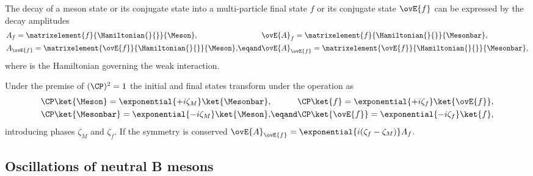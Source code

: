 The decay of a meson state \Meson or its \CP conjugate state \Mesonbar into a
multi-particle final state $f$ or its \CP conjugate state $\ovE{f}$ can be
expressed by the decay amplitudes
%
\begin{equation}
  \begin{alignedat}{2}
    & A_f         = \matrixelement{f}{\Hamiltonian{}{}}{\Meson},       && \ovE{A}_f         = \matrixelement{f}{\Hamiltonian{}{}}{\Mesonbar}, \\
    & A_{\ovE{f}} = \matrixelement{\ovE{f}}{\Hamiltonian{}{}}{\Meson}, &\eqand& \ovE{A}_{\ovE{f}} = \matrixelement{\ovE{f}}{\Hamiltonian{}{}}{\Mesonbar},
  \end{alignedat}
\end{equation}
%
where \Hamiltonian{}{} is the Hamiltonian governing the weak interaction.

Under the premise of $(\CP)^2 = 1$ the initial and final states transform under
the \CP operation as
%
\begin{equation}
  \begin{alignedat}{2}
    & \CP\ket{\Meson}    = \exponential{+i\zeta_{M}} \ket{\Mesonbar}, && \CP \ket{f}        = \exponential{+i\zeta_{f}} \ket{\ovE{f}}, \\
    & \CP\ket{\Mesonbar} = \exponential{-i\zeta_{M}} \ket{\Meson}   , &\eqand& \CP \ket{\ovE{f}}  = \exponential{-i\zeta_{f}} \ket{f},
  \end{alignedat}
\end{equation}
%
introducing phases $\zeta_M$ and $\zeta_f$. If the \CP symmetry is conserved
$\ovE{A}_{\ovE{f}} = \exponential{i(\zeta_f - \zeta_M)} A_f$.

\subsection{Oscillations of neutral B mesons}
\label{sec:cpv_theory:flavour_physics:bmixing}

